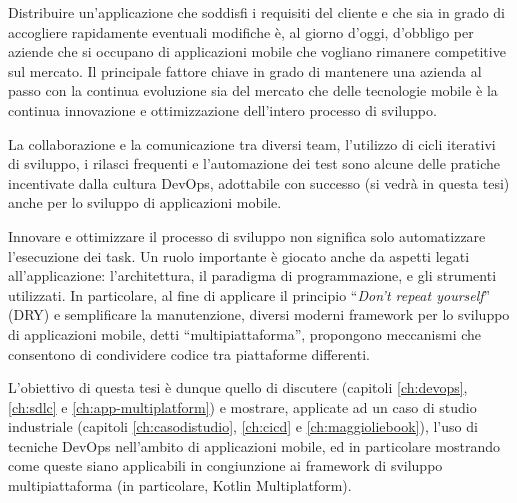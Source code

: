 
Distribuire un'applicazione che soddisfi i requisiti del cliente e che sia in grado di accogliere rapidamente eventuali modifiche è, 
al giorno d’oggi, 
d'obbligo per aziende che si occupano di applicazioni mobile che vogliano rimanere competitive sul mercato.
Il principale fattore chiave in grado di mantenere una azienda al passo con la continua evoluzione sia del mercato che delle tecnologie mobile è la continua innovazione e ottimizzazione dell'intero processo di sviluppo.

La collaborazione e la comunicazione tra diversi team, 
l'utilizzo di cicli iterativi di sviluppo, 
i rilasci frequenti e l'automazione dei test sono alcune delle pratiche incentivate dalla cultura DevOps, 
adottabile con successo (si vedrà in questa tesi) anche per lo sviluppo di applicazioni mobile.

Innovare e ottimizzare il processo di sviluppo non significa solo automatizzare l'esecuzione dei task.
Un ruolo importante è giocato anche da aspetti legati all'applicazione:
l'architettura,
il paradigma di programmazione,
e gli strumenti utilizzati.
In particolare,
al fine di applicare il principio ``\textit{Don't repeat yourself}'' (DRY) e semplificare la manutenzione,
diversi moderni framework per lo sviluppo di applicazioni mobile,
detti ``multipiattaforma'', 
propongono meccanismi che consentono di condividere codice tra piattaforme differenti.

L'obiettivo di questa tesi è dunque quello di discutere
(capitoli \ref{ch:devops}, \ref{ch:sdlc} e \ref{ch:app-multiplatform})
e mostrare, applicate ad un caso di studio industriale
(capitoli \ref{ch:casodistudio}, \ref{ch:cicd} e \ref{ch:maggioliebook}),
l'uso di tecniche DevOps
nell'ambito di applicazioni mobile,
ed in particolare mostrando come queste siano applicabili in congiunzione
ai framework di sviluppo multipiattaforma (in particolare, Kotlin Multiplatform).

